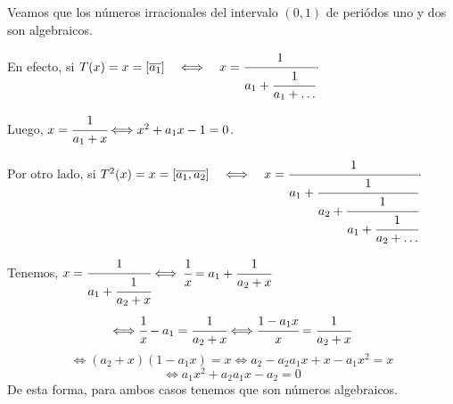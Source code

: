 



\begin{ejem}
Veamos que los números irracionales del intervalo $(0,1)$ de periódos uno y dos son algebraicos.

En efecto, si $T(x)=x=[\overline{a_{1}}] \quad \Longleftrightarrow\quad x=\cfrac{1}{a_{1}+\cfrac{1}{a_{1}+\ldots}}\cdot$

Luego, $x=\cfrac{1}{a_{1}+x}\Longleftrightarrow x^{2}+a_{1}x-1=0$.


Por otro lado, si $T^{2}(x)=x=[\overline{a_{1},a_{2}}]\quad \Longleftrightarrow\quad x=\cfrac{1}{a_{1}+\cfrac{1}{a_{2}+\cfrac{1}{a_{1}+\cfrac{1}{a_{2}+\ldots}}}}\cdot$

Tenemos, $x=\cfrac{1}{a_{1}+\cfrac{1}{a_{2}+x}} \Longleftrightarrow $ $\cfrac{1}{x}=a_{1}+\cfrac{1}{a_{2}+x}$
$$
\Longleftrightarrow \cfrac{1}{x}-a_{1}=\cfrac{1}{a_{2}+x}\Longleftrightarrow \cfrac{1-a_{1}x}{x}=\cfrac{1}{a_{2}+x}
$$
$$
\Longleftrightarrow(a_{2}+x)(1-a_{1}x)=x\Longleftrightarrow a_{2}-a_{2}a_{1}x+x-a_{1}x^{2}=x
$$
$$
\Longleftrightarrow a_{1}x^{2}+a_{2}a_{1}x-a_{2}=0
$$
De esta forma, para ambos casos tenemos que son números algebraicos.
\end{ejem}

